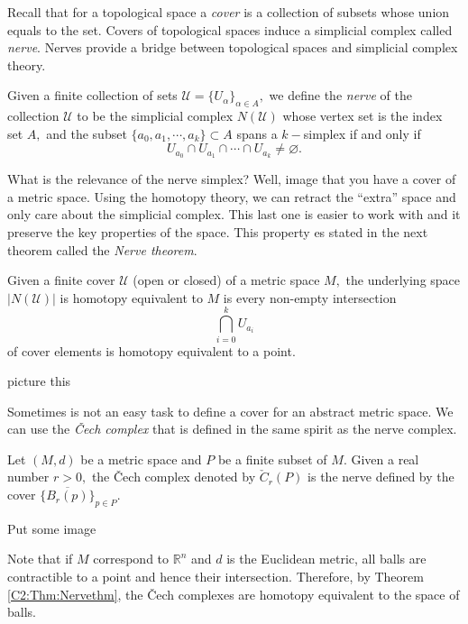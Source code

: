 \documentclass[
	fontsize=10pt, %
	twoside=false, %
	secnumdepth=1, %
]{kaobook}
\begin{document}
Recall that for a topological space a \emph{cover} is a collection of subsets whose union equals to the set. Covers of topological spaces induce a simplicial complex called \emph{nerve}. Nerves provide a bridge between topological spaces and simplicial complex theory. 

\begin{definition}
Given a finite collection of sets $\mathcal{U}=\{U_\alpha\}_{\alpha\in A},$ we define the \emph{nerve} of the collection $\mathcal{U}$ to be the simplicial complex $N(\mathcal{U})$ whose vertex set is the index set $A,$ and the subset $\{a_0,a_1,\cdots, a_k\}\subset A$ spans a $k-$simplex if and only if $$U_{a_0}\cap U_{a_1}\cap\cdots \cap U_{a_k}\neq \varnothing.$$
\end{definition}

What is the relevance of the nerve simplex? Well, image that you have a cover of a metric space. Using the homotopy theory, we can retract the ``extra'' space and only care about the simplicial complex. This last one is easier to work with and it preserve the key properties of the space. This property es stated in the next theorem called the \emph{Nerve theorem}.

\begin{theorem}
\label{C2:Thm:Nervethm}
Given a finite cover $\mathcal{U}$ (open or closed) of a metric space $M,$ the underlying space $|N(\mathcal{U})|$ is homotopy equivalent to $M$ is every non-empty intersection $$\bigcap_{i=0}^k U_{a_i}$$ of cover elements is homotopy equivalent to a point. 
\end{theorem}

{\color{red} picture this}

Sometimes is not an easy task to define a cover for an abstract metric space. We can use the \emph{\v{C}ech complex} that is defined in the same spirit as the nerve complex. 

\begin{definition}
Let $(M,d)$ be a metric space and $P$ be a finite subset of $M.$ Given a real number $r>0,$ the \v{C}ech complex denoted by $\check{C}_r(P)$ is the nerve defined by the cover $\{\overline{B_r(p)}\}_{p\in P}.$
\end{definition}

{\color{red} Put some image}

Note that if $M$ correspond to $\mathbb{R}^n$ and $d$ is the Euclidean metric, all balls are contractible to a point and hence their intersection. Therefore, by Theorem \ref{C2:Thm:Nervethm}, the \v{C}ech complexes are homotopy equivalent to the space of balls. 
\end{document}
